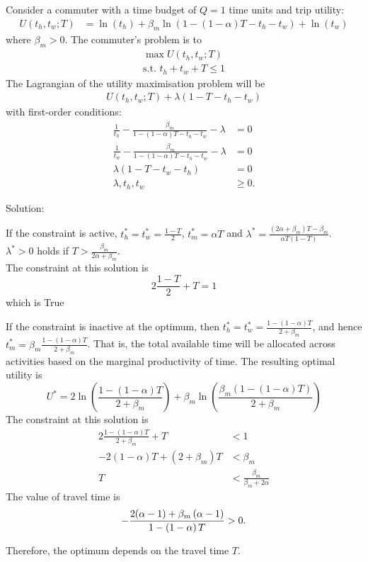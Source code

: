 \documentclass[12pt,a4paper,british]{article}
\theoremstyle{definition}
\theoremstyle{plain}
\theoremstyle{plain}
\begin{document}
Consider a commuter with a time budget of $Q=1$ time units and trip
utility:
\begin{align*}
U\left(t_{h},t_{w};T\right) & =\ln\left(t_{h}\right)+\beta_{m}\ln\left(1-\left(1-\alpha\right)T-t_{h}-t_{w}\right)+\ln\left(t_{w}\right)
\end{align*}
where $\beta_{m}>0$. The commuter's problem is to 
\begin{gather*}
\max U\left(t_{h},t_{w};T\right)\\
\mbox{s.t. }t_{h}+t_{w}+T\leq1
\end{gather*}
The Lagrangian of the utility maximisation problem will be
\begin{gather*}
U\left(t_{h},t_{w};T\right)+\lambda\left(1-T-t_{h}-t_{w}\right)
\end{gather*}
with first-order conditions:
\begin{align*}
\frac{1}{t_{h}}-\frac{\beta_{m}}{1-\left(1-\alpha\right)T-t_{h}-t_{w}}-\lambda & =0\\
\frac{1}{t_{w}}-\frac{\beta_{m}}{1-\left(1-\alpha\right)T-t_{h}-t_{w}}-\lambda & =0\\
\lambda\left(1-T-t_{w}-t_{h}\right) & =0\\
\lambda,t_{h},t_{w} & \geq0.
\end{align*}

Solution:
\begin{casenv}
\item If the constraint is active, $t_{h}^{\ast}=t_{w}^{\ast}=\frac{1-T}{2}$,
$t_{m}^{\ast}=\alpha T$ and $\lambda^{\ast}=\frac{\left(2\alpha+\beta_{m}\right)T-\beta_{m}}{\alpha T\left(1-T\right)}$.
$\lambda^{\ast}>0$ holds if $T>\frac{\beta_{m}}{2\alpha+\beta_{m}}$.
\\
The constraint at this solution is
\[
2\frac{1-T}{2}+T=1
\]
which is True
\item If the constraint is inactive at the optimum, then $t_{h}^{\ast}=t_{w}^{\ast}=\frac{1-\left(1-\alpha\right)T}{2+\beta_{m}}$,
and hence $t_{m}^{\ast}=\beta_{m}\frac{1-\left(1-\alpha\right)T}{2+\beta_{m}}$.
That is, the total available time will be allocated across activities
based on the marginal productivity of time. The resulting optimal
utility is
\[
U^{\ast}=2\ln\left(\frac{1-\left(1-\alpha\right)T}{2+\beta_{m}}\right)+\beta_{m}\ln\left(\frac{\beta_{m}\left(1-\left(1-\alpha\right)T\right)}{2+\beta_{m}}\right)
\]
The constraint at this solution is
\begin{align*}
2\frac{1-\left(1-\alpha\right)T}{2+\beta_{m}}+T & <1\\
-2\left(1-\alpha\right)T+\left(2+\beta_{m}\right)T & <\beta_{m}\\
T & <\frac{\beta_{m}}{\beta_{m}+2\alpha}
\end{align*}
The value of travel time is
\[
-\frac{2\text{\ensuremath{\left(\alpha-1\right)}}+\beta_{m}\left(\alpha-1\right)}{1-\left(1-\alpha\right)T}>0.
\]
\end{casenv}
Therefore, the optimum depends on the travel time $T$.
\end{document}
